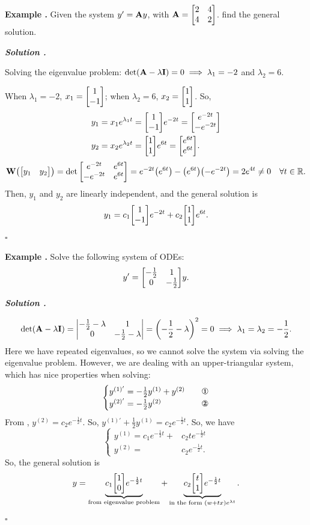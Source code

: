 \documentclass[12pt, a4paper]{article}
\newcounter{index}[subsection]
\newenvironment*{eg}{\begin{framed}\par\noindent\textbf{Example \thesubsection.\stepcounter{index}\theindex}}{\par\end{framed}}
\newcounter{nprf}[subsection]
\newenvironment*{sol}{\par\indent\textbf{\textit{Solution \stepcounter{nprf}\thenprf.}}\par}{\hfill{$\square$}\par}
\def\R{{\mathbb{R}}}
\def\A{\vb A}
\def\W{\vb W}
\begin{document}
\begin{eg}
	Given the system $y'=\A y$, with $\A=\mqty[2&4\\4&2]$. find the general solution.
	\begin{sol}
		Solving the eigenvalue problem: $\det(\A-\lambda\vb I)=0\implies\lambda_1=-2$ and $\lambda_2=6$.\par When $\lambda_1=-2$, $x_1=\mqty[1\\-1]$; when $\lambda_2=6$, $x_2=\mqty[1\\1]$. So, \begin{align*}y_1&=x_1e^{\lambda_1t}=\mqty[1\\-1]e^{-2t}=\mqty[e^{-2t}\\-e^{-2t}]\\y_2&=x_2e^{\lambda_2t}=\mqty[1\\1]e^{6t}=\mqty[e^{6t}\\e^{6t}].\end{align*} \[\W\qty(\mqty[y_1&y_2])=\det\mqty[e^{-2t}&e^{6t}\\-e^{-2t}&e^{6t}]=e^{-2t}\qty(e^{6t})-\qty(e^{6t})\qty(-e^{-2t})=2e^{4t}\neq0\quad\forall t\in\R.\] Then, $y_1$ and $y_2$ are linearly independent, and the general solution is \[y_1=c_1\mqty[1\\-1]e^{-2t}+c_2\mqty[1\\1]e^{6t}.\]
	\end{sol}
\end{eg}
\begin{eg}
	Solve the following system of ODEs: \[y'=\mqty[-\frac{1}{2}&1\\0&-\frac{1}{2}]y.\]
	\begin{sol}
		\[\det(\A-\lambda\vb I)=\mqty|-\frac{1}{2}-\lambda&1\\0&-\frac{1}{2}-\lambda|=\qty(-\dfrac{1}{2}-\lambda)^2=0\implies \lambda_1=\lambda_2=-\dfrac{1}{2}.\] Here we have repeated eigenvalues, so we cannot solve the system via solving the eigenvalue problem. However, we are dealing with an upper-triangular system, which has nice properties when solving: \[\begin{cases}y^{(1)'}=-\frac{1}{2}y^{(1)}+y^{(2)}\quad&\text{\ding{172}}\\y^{(2)'}=-\frac{1}{2}y^{(2)}\quad&\text{\ding{173}}\end{cases}\] From , $y^{(2)}=c_2e^{-\frac{1}{2}t}$. So, $y^{(1)'}+\frac{1}{2}y^{(1)}=c_2e^{-\frac{1}{2}t}$. So, we have \[\begin{cases}y^{(1)}=c_1e^{-\frac{1}{2}t}+&c_2te^{-\frac{1}{2}t}\\y^{(2)}=&c_2e^{-\frac{1}{2}t}.\end{cases}\] So, the general solution is \[y=\underbrace{c_1\mqty[1\\0]e^{-\frac{1}{2}t}}_\text{from eigenvalue problem}+\underbrace{c_2\mqty[t\\1]e^{-\frac{1}{2}t}}_{\text{in the form }\qty(w+tx)e^{\lambda t}}.\]
	\end{sol}
\end{eg}
\end{document}
